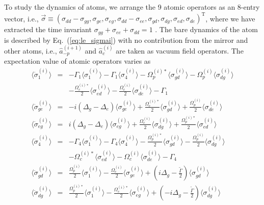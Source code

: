 \documentclass[aps, pra, reprint, amsmath, amssymb, groupedaddress, acknowledgments]{revtex4-1}
\begin{document}
To study the dynamics of atoms, we arrange the 9 atomic operators as an 8-entry vector, i.e., $\vec{\sigma} \equiv (\sigma_{dd}-\sigma_{gg},\sigma_{ge},\sigma_{eg}, \sigma_{dd}-\sigma_{ee},\sigma_{gd},\sigma_{dg},\sigma_{ed},\sigma_{de} )^\textrm{T}$, where we have extracted the time invariant $\sigma_{gg}+\sigma_{ee}+\sigma_{dd}=1$ \cite{Lau:2016cool}.  The bare dynamics of the atom is described by Eq.~(\ref{eq:le_sigmai})  with no contribution from the mirror and other atoms, i.e., $\hat{a}_{-p}^{(i+1)}$ and  $\hat{a}_{c}^{(i)}$ are taken as vacuum field operators.  The expectation value of atomic operators varies as
\begin{eqnarray}
\langle\dot{\sigma}^{(i)}_{1}\rangle &=& -\Gamma_1 \langle\sigma^{(i)}_{1}\rangle  -\Gamma_1 \langle\sigma^{(i)}_{4}\rangle - \Omega_p^{(i) \ast} \langle \sigma^{(i)}_{gd} \rangle - \Omega_p^{(i)} \langle \sigma^{(i)}_{dg} \rangle \nonumber \\
&&- \frac{\Omega_c^{(i) \ast}}{2} \langle \sigma^{(i)}_{ed} \rangle - \frac{\Omega_c^{(i)}}{2} \langle \sigma^{(i)}_{de} \rangle -\Gamma_1 \nonumber \\
\langle\dot{\sigma}^{(i)}_{ge} \rangle &=& -i (\Delta_g - \Delta_e) \langle \sigma^{(i)}_{ge}\rangle + \frac{\Omega_c^{(i) \ast}}{2} \langle \sigma^{(i)}_{gd}\rangle + \frac{\Omega_p^{(i)}}{2} \langle \sigma^{(i)}_{de} \rangle \nonumber \\ 
\langle\dot{\sigma}^{(i)}_{eg} \rangle &=& i (\Delta_g - \Delta_e) \langle \sigma^{(i)}_{eg}\rangle + \frac{\Omega_c^{(i) }}{2} \langle \sigma^{(i)}_{dg}\rangle + \frac{\Omega_p^{(i)\ast}}{2} \langle \sigma^{(i)}_{ed} \rangle \nonumber \\
\langle\dot{\sigma}^{(i)}_{4}\rangle &=& -\Gamma_4 \langle\sigma^{(i)}_{1}\rangle  -\Gamma_4 \langle\sigma^{(i)}_{4}\rangle - \frac{\Omega_p^{(i) \ast}}{2} \langle \sigma^{(i)}_{gd} \rangle - \frac{\Omega_p^{(i)}}{2} \langle \sigma^{(i)}_{dg} \rangle \nonumber \\
&& - \Omega_c^{(i) \ast} \langle \sigma^{(i)}_{ed} \rangle - \Omega_c^{(i)} \langle \sigma^{(i)}_{de} \rangle -\Gamma_4 \nonumber \\
\langle\dot{\sigma}^{(i)}_{gd}\rangle &=& \frac{\Omega_p^{(i)}}{2}  \langle\sigma^{(i)}_{1}\rangle -  \frac{\Omega_c^{(i)}}{2} \langle\sigma^{(i)}_{ge}\rangle + (i \Delta_g - \frac{\tilde{\Gamma}}{2}) \langle\sigma^{(i)}_{gd}\rangle \nonumber \\
\langle\dot{\sigma}^{(i)}_{dg}\rangle &=& \frac{\Omega_p^{(i)\ast}}{2}  \langle\sigma^{(i)}_{1}\rangle -  \frac{\Omega_c^{(i)\ast}}{2} \langle\sigma^{(i)}_{eg}\rangle + (-i \Delta_g - \frac{\tilde{\Gamma}}{2}) \langle\sigma^{(i)}_{dg}\rangle \nonumber \\

\end{eqnarray}
\end{document}
